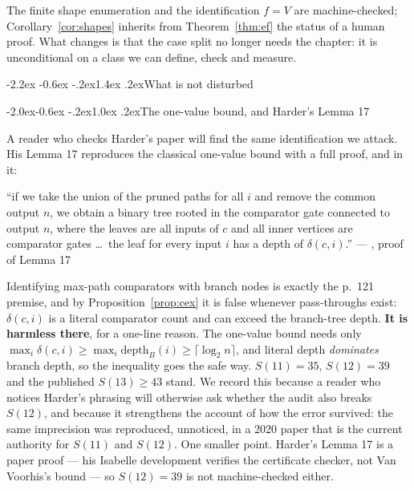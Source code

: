 \documentclass[11pt,a4paper]{article}
\makeatletter
\renewenvironment{quote}{\begin{oldquote}\small}{\end{oldquote}}
\renewcommand\section{\@startsection{section}{1}{\z@}%
  {-2.2ex \@plus -0.6ex \@minus -.2ex}{1.4ex \@plus.2ex}{\normalfont\large\bfseries}}
\renewcommand\subsection{\@startsection{subsection}{2}{\z@}%
  {-2.0ex\@plus -0.6ex \@minus -.2ex}{1.0ex \@plus .2ex}{\normalfont\normalsize\bfseries}}
\makeatother
\begin{document}
The finite shape enumeration and the identification $f = V$ are machine-checked;
Corollary~\ref{cor:shapes} inherits from Theorem~\ref{thm:ef} the status of a
human proof. What changes is that the case split no longer needs the chapter: it
is unconditional on a class we can define, check and measure.

\section{What is not disturbed}
\label{sec:undisturbed}

\subsection{The one-value bound, and Harder's Lemma 17}

A reader who checks Harder's paper will find the same identification we attack.
His Lemma 17 reproduces the classical one-value bound with a full proof, and in
it:

\begin{quote}
``if we take the union of the pruned paths for all $i$ and remove the common
output $n$, we obtain a binary tree rooted in the comparator gate connected to
output $n$, where the leaves are all inputs of $c$ and all inner vertices are
comparator gates \dots\ the leaf for every input $i$ has a depth of
$\delta(c,i)$.'' \hfill --- \cite{Ha20}, proof of Lemma 17
\end{quote}

Identifying max-path comparators with branch nodes is exactly the p.~121
premise, and by Proposition~\ref{prop:cex} it is false whenever pass-throughs
exist: $\delta(c,i)$ is a literal comparator count and can exceed the
branch-tree depth. \textbf{It is harmless there}, for a one-line reason. The
one-value bound needs only
$\max_i \delta(c,i) \ge \max_i \mathrm{depth}_B(i) \ge \lceil\log_2 n\rceil$,
and literal depth \emph{dominates} branch depth, so the inequality goes the safe
way. $S(11) = 35$, $S(12) = 39$ and the published $S(13) \ge 43$ stand. We
record this because a reader who notices Harder's phrasing will otherwise ask
whether the audit also breaks $S(12)$, and because it strengthens the account of
how the error survived: the same imprecision was reproduced, unnoticed, in a
2020 paper that is the current authority for $S(11)$ and $S(12)$. One smaller
point. Harder's Lemma 17 is a paper proof --- his Isabelle development verifies
the certificate checker, not Van Voorhis's bound --- so $S(12) = 39$ is not
machine-checked either.
\end{document}
